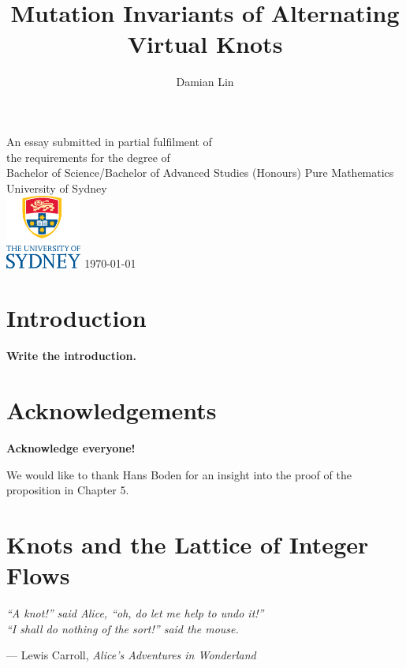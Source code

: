\documentclass[12pt]{report}
\newcommand{\notered}[1]{{\color{Red} \textbf{#1}}}
\begin{document}
	

\author{Damian Lin}
\title{Mutation Invariants of Alternating Virtual Knots}

\cleardoublepage \thispagestyle{empty}
\null \vfil
\begingroup
\LARGE \bfseries \centering
\openup \medskipamount
\thetitle \par \vspace{30pt}
\centering \mdseries \theauthor \par \bigskip
\endgroup
\vfil \vfil \vfil
\begin{center}
	An essay submitted in partial fulfilment of\\
	the requirements for the degree of\\
	Bachelor of Science/Bachelor of Advanced Studies (Honours)
	\vfil\vfil
	{\large Pure Mathematics\\[5pt]
		University of Sydney}\\
	\vskip6mm
	\includegraphics[width=25mm]{graphics/USY_MB1_CMYK_Stacked_Logo}
	\vfil
	\normalsize\today
\end{center}
\vfil
\cleardoublepage

\tableofcontents

\chapter*{Introduction}

\notered{Write the introduction.}

\chapter*{Acknowledgements}

\notered{Acknowledge everyone!}

We would like to thank Hans Boden for an insight into the proof of the proposition in Chapter 5.


\chapter{Knots and the Lattice of Integer Flows}
\epigraph{\itshape ``A knot!'' said Alice, ``oh, do let me help to undo it!''\\``I shall do nothing of the sort!'' said the mouse.}{--- Lewis Carroll, \textit{Alice's Adventures in Wonderland}}
\end{document}
